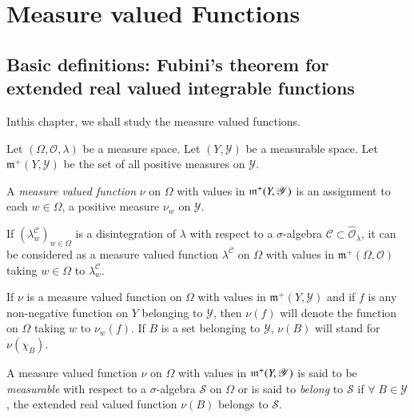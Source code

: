 
\chapter{Measure valued Functions}\label{part1:chap2}

\section[Basic definitions: Fubini's theorem...]{Basic definitions: 
Fubini's theorem for extended real valued
  integrable functions}\label{part1:chap2:sec1}

In\pageoriginale  this chapter, we shall study the measure valued
functions. 

Let $(\Omega, \mathscr{O}, \lambda)$ be a measure space. Let $(Y,
\mathscr{Y})$ be a measurable space. Let $\mathfrak{m}^+ (Y,
\mathscr{Y})$ be the set of all positive measures on $\mathscr{Y}$. 

\begin{defn}\label{part1:chap2:def12} 
A {\em measure valued function} $\nu$ on $\Omega$ with values in
$\mathfrak{m}^+ (Y,\break \mathscr{Y})$ is an assignment to each $w \in
\Omega$, a positive measure $\nu_w$ on $\mathscr{Y}$. 
\end{defn}

If $(\lambda^\mathscr{C}_w)_{w \in \Omega}$ is a disintegration of
$\lambda$ with respect to a $\sigma$-algebra $\mathscr{C} \subset
\hat{\mathscr{O}}_\lambda$, it can be considered as a measure valued
function $\lambda^\mathscr{C}$ on $\Omega$ with values in
$\mathfrak{m}^+ (\Omega, \mathscr{O})$ taking $w \in\Omega$ to
$\lambda^\mathscr{C}_w$.  

If $\nu$ is a measure valued function on $\Omega$ with values in
$\mathfrak{m}^+(Y,\mathscr{Y})$ and if $f$ is any non-negative
function on $Y$ belonging to $\mathscr{Y}$, then $\nu(f)$ will denote
the function on $\Omega$ taking $w$ to $\nu_w (f)$. If $B$ is a set
belonging to $\mathscr{Y}$, $\nu(B)$ will stand for $\nu(\chi_B)$. 

\begin{defn}\label{part1:chap2:def13}
A measure valued function $\nu$ on $\Omega$ with values in
$\mathfrak{m}^+ (Y,\break \mathscr{Y})$ is said to be {\em measurable} with
respect to a $\sigma$-algebra $\mathcal{S}$ on $\Omega$ or is said to
{\em belong} to $\mathcal{S}$ if $\forall\; B \in \mathscr{Y}$, the
extended real valued function $\nu(B)$ belongs to $\mathcal{S}$. 
\end{defn}


